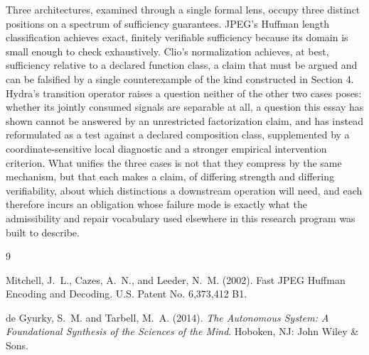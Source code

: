 \documentclass[11pt]{article}
\begin{document}
Three architectures, examined through a single formal lens, occupy three distinct positions on a spectrum of sufficiency guarantees. JPEG's Huffman length classification achieves exact, finitely verifiable sufficiency because its domain is small enough to check exhaustively. Clio's normalization achieves, at best, sufficiency relative to a declared function class, a claim that must be argued and can be falsified by a single counterexample of the kind constructed in Section 4. Hydra's transition operator raises a question neither of the other two cases poses: whether its jointly consumed signals are separable at all, a question this essay has shown cannot be answered by an unrestricted factorization claim, and has instead reformulated as a test against a declared composition class, supplemented by a coordinate-sensitive local diagnostic and a stronger empirical intervention criterion. What unifies the three cases is not that they compress by the same mechanism, but that each makes a claim, of differing strength and differing verifiability, about which distinctions a downstream operation will need, and each therefore incurs an obligation whose failure mode is exactly what the admissibility and repair vocabulary used elsewhere in this research program was built to describe.

\begin{thebibliography}{9}

Mitchell, J.~L., Cazes, A.~N., and Leeder, N.~M. (2002). Fast JPEG Huffman Encoding and Decoding. U.S. Patent No. 6,373,412 B1.

de Gyurky, S.~M. and Tarbell, M.~A. (2014). \textit{The Autonomous System: A Foundational Synthesis of the Sciences of the Mind}. Hoboken, NJ: John Wiley \& Sons.

\end{thebibliography}
\end{document}
